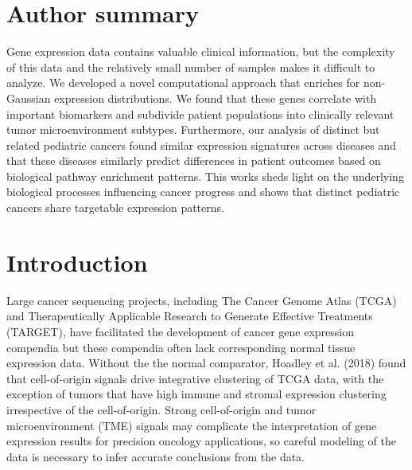 \documentclass[10pt,letterpaper]{article}
\begin{document}
\section*{Author summary}
Gene expression data contains valuable clinical information, but the complexity of this data and the relatively small number of samples makes it difficult to analyze. We developed a novel computational approach that enriches for non-Gaussian expression distributions. We found that these genes correlate with important biomarkers and subdivide patient populations into clinically relevant tumor microenvironment subtypes. Furthermore, our analysis of distinct but related pediatric cancers found similar expression signatures across diseases and that these diseases similarly predict differences in patient outcomes based on biological pathway enrichment patterns. This works sheds light on the underlying biological processes influencing cancer progress and shows that distinct pediatric cancers share targetable expression patterns. 

\linenumbers

\section*{Introduction}
Large cancer sequencing projects, including The Cancer Genome Atlas (TCGA) and Therapeutically Applicable Research to Generate Effective Treatments (TARGET), have facilitated the development of cancer gene expression compendia \cite{vivianToilEnablesReproducible2017, pughGeneticLandscapeHighrisk2013, goldmanUCSCXenaPlatform2018, thecancergenomeatlasresearchnetworkCancerGenomeAtlas2013, newtonTumorMapExploringMolecular2017} but these compendia often lack corresponding normal tissue expression data. Without the the normal comparator, Hoadley et al. (2018) found that cell-of-origin signals drive integrative clustering of TCGA data, with the exception of tumors that have high immune and stromal expression clustering irrespective of the cell-of-origin. Strong cell-of-origin and tumor microenvironment (TME) signals may complicate the interpretation of gene expression results for precision oncology applications, so careful modeling of the data is necessary to infer accurate conclusions from the data. 
\end{document}
